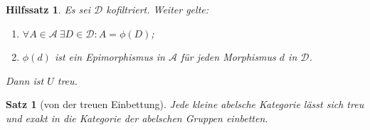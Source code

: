 \documentclass[a4paper, parskip=half,11pt]{scrartcl}
\theoremstyle{marginbreak}
\newtheorem{theorem}[remark]{Satz}
\newtheorem{lemma}[remark]{Hilfssatz}
\theoremstyle{nonumberplain}
\newtheorem{proof}{Beweis.}
\newcommand\cat\mathcal
\newcommand{\p}[1]{\iftoggle{proofs}{#1}{}}
\DeclareMathOperator{\id}{id}
\begin{document}
		\begin{lemma}
			Es sei $\cat{D}$ kofiltriert. Weiter gelte:
			\begin{enumerate}[label=(\arabic*)]
				\item $\forall A\in\cat{A}\ \exists D\in\cat{D}: A=\phi(D)$;
				\item $\phi(d)$ ist ein Epimorphismus in $\cat{A}$ für jeden Morphismus $d$ in $\cat{D}$.
			\end{enumerate}
			Dann ist $U$ treu.
		\end{lemma}
		\p{\begin{proof}
			Es seien $f\colon A\rightrightarrows B$ Morphismen in $\cat{A}$ mit
			$U(f)=U(g)$. $a\in U(A)$ sei die Äquivalenzklasse von $\alpha\colon\phi(D)\to A$.
			Es ist$[f\circ\alpha]_\approx=U(f)(a)=U(g)(a)=[g\circ\alpha]_\approx$, also
			existiert $d\colon D'\to D$ in $\cat{D}$ mit $f\circ\alpha\circ\phi(d)=g\circ\alpha\circ\phi(d)$.

			Ist nun $\phi(\overline{D})=A$ für ein $\overline{D}\in\cat{D}$ (Voraussetzung),
			so wähle $\alpha\coloneqq\id_{A}$. Wir erhalten $f\circ \id_A\circ\phi(d)=g\circ\id_A\circ\phi(d)$.
			Nach Voraussetzung ist $\phi(d)$ ein Epimorphismus und es folgt $f=g$.
		\end{proof}}
		\begin{theorem}[von der treuen Einbettung]\label{abeb}
			Jede kleine abelsche Kategorie lässt sich treu und exakt in die Kategorie
			der abelschen Gruppen einbetten.
		\end{theorem}
\end{document}
